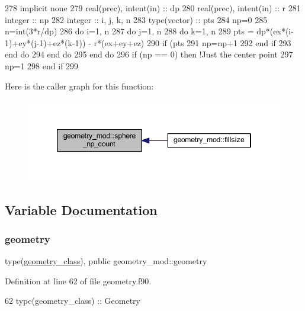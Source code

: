\begin{DoxyCode}
278     \textcolor{keywordtype}{implicit none}
279     \textcolor{keywordtype}{real(prec)}, \textcolor{keywordtype}{intent(in)} :: dp
280     \textcolor{keywordtype}{real(prec)}, \textcolor{keywordtype}{intent(in)} :: r
281     \textcolor{keywordtype}{integer} :: np
282     \textcolor{keywordtype}{integer} :: i, j, k, n
283     \textcolor{keywordtype}{type}(vector) :: pts
284     np=0
285     n=int(3*r/dp)
286     \textcolor{keywordflow}{do} i=1, n
287         \textcolor{keywordflow}{do} j=1, n
288             \textcolor{keywordflow}{do} k=1, n
289                 pts = dp*(ex*(i-1)+ey*(j-1)+ez*(k-1)) - r*(ex+ey+ez)
290                 \textcolor{keywordflow}{if} (pts%
291                     np=np+1
292 \textcolor{keywordflow}{                end if}
293 \textcolor{keywordflow}{            end do}
294 \textcolor{keywordflow}{        end do}
295 \textcolor{keywordflow}{    end do}
296     \textcolor{keywordflow}{if} (np == 0) \textcolor{keywordflow}{then} \textcolor{comment}{!Just the center point}
297         np=1
298 \textcolor{keywordflow}{    end if}
299 
\end{DoxyCode}
Here is the caller graph for this function\+:\nopagebreak
\begin{figure}[H]
\begin{center}
\leavevmode
\includegraphics[width=346pt]{namespacegeometry__mod_a05de7940b4e7df5a2b31f3d0414e3743_icgraph}
\end{center}
\end{figure}


\subsection{Variable Documentation}
\mbox{\label{namespacegeometry__mod_ad2ad4f7e1138beaad5f37d5c15b7b457}} 
\subsubsection{\texorpdfstring{geometry}{geometry}}
{\footnotesize\ttfamily type(\mbox{\hyperlink{structgeometry__mod_1_1geometry__class}{geometry\+\_\+class}}), public geometry\+\_\+mod\+::geometry}



Definition at line 62 of file geometry.\+f90.


\begin{DoxyCode}
62     \textcolor{keywordtype}{type}(geometry\_class) :: Geometry
\end{DoxyCode}
